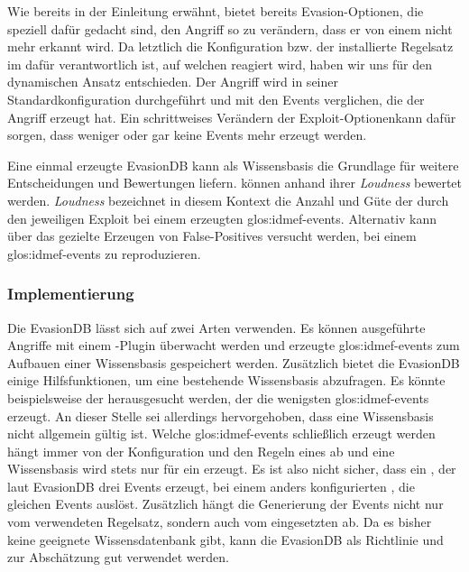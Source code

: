 Wie bereits in der Einleitung erwähnt, bietet  bereits
Evasion-Optionen, die speziell dafür gedacht sind, den Angriff so zu
verändern, dass er von einem  nicht mehr erkannt wird. Da
letztlich die Konfiguration bzw. der installierte Regelsatz im
 dafür verantwortlich ist, auf welchen  reagiert wird,
haben wir uns für den dynamischen Ansatz entschieden. Der Angriff wird
in seiner Standardkonfiguration durchgeführt und mit den Events
verglichen, die der Angriff erzeugt hat. Ein schrittweises Verändern
der Exploit-Optionenkann dafür sorgen, dass weniger oder gar keine
Events mehr erzeugt werden.

Eine einmal erzeugte EvasionDB kann als Wissensbasis die Grundlage für
weitere Entscheidungen und Bewertungen liefern.  können anhand
ihrer \textit{Loudness} bewertet werden. \textit{Loudness} bezeichnet in diesem
Kontext die Anzahl und Güte der durch den jeweiligen Exploit bei einem
 erzeugten \glspl{glos:idmef-event}. Alternativ kann über das
gezielte Erzeugen von False-Positives versucht werden, bei einem 
\glspl{glos:idmef-event} zu reproduzieren.

\subsubsection{Implementierung}

Die EvasionDB lässt sich auf zwei Arten verwenden. Es können
ausgeführte Angriffe mit einem -Plugin überwacht werden und
erzeugte \glspl{glos:idmef-event} zum Aufbauen einer Wissensbasis
gespeichert werden. Zusätzlich bietet die EvasionDB einige
Hilfsfunktionen, um eine bestehende Wissensbasis abzufragen. Es könnte
beispielsweise der  herausgesucht werden, der die wenigsten
\glspl{glos:idmef-event} erzeugt. An dieser Stelle sei allerdings
hervorgehoben, dass eine Wissensbasis nicht allgemein gültig
ist. Welche \glspl{glos:idmef-event} schließlich erzeugt werden hängt
immer von der Konfiguration und den Regeln eines  ab und eine
Wissensbasis wird stets nur für ein  erzeugt. Es ist also
nicht sicher, dass ein , der laut EvasionDB drei Events
erzeugt, bei einem anders konfigurierten , die gleichen
Events auslöst. Zusätzlich hängt die Generierung der Events nicht nur
vom verwendeten Regelsatz, sondern auch vom eingesetzten 
ab. Da es bisher keine geeignete Wissensdatenbank gibt, kann die
EvasionDB als Richtlinie und zur Abschätzung gut verwendet
werden.

